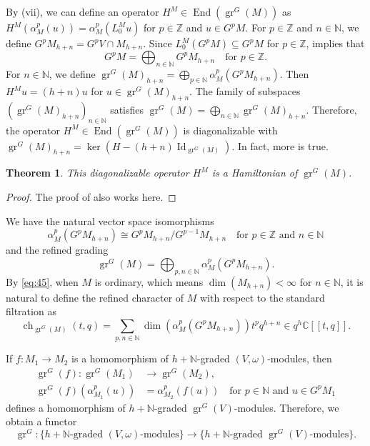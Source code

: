 \documentclass[a4paper, 12pt, reqno]{amsart}
\newtheorem{theorem}{Theorem}[section]
\theoremstyle{remark}
\DeclareMathOperator{\Id}{Id}
\DeclareMathOperator{\gr}{gr}
\DeclareMathOperator{\End}{End}
\DeclareMathOperator{\ch}{ch}
\begin{document}
By (vii), we can define an operator $H^M \in \End(\gr^G(M))$ as $H^M(\alpha_M^p(u)) = \alpha_M^p(L^M_0u)$ for $p \in \mathbb{Z}$ and $u \in G^pM$.
For $p \in \mathbb{Z}$ and $n \in \mathbb{N}$, we define $G^pM_{h + n} = G^pV \cap M_{h + n}$.
Since $L_0^M(G^pM) \subseteq G^pM$ for $p \in \mathbb{Z}$,  implies that
\begin{equation*}
  G^pM = \bigoplus_{n \in \mathbb{N}}G^pM_{h + n} \quad \text{for $p \in \mathbb{Z}$}.
\end{equation*}
For $n \in \mathbb{N}$, we define $\gr^G(M)_{h + n} = \bigoplus_{p \in \mathbb{N}}\alpha_M^p(G^pM_{h + n})$.
Then $H^Mu = (h + n)u$ for $u \in \gr^G(M)_{h + n}$.
The family of subspaces $(\gr^G(M)_{h + n})_{n \in \mathbb{N}}$ satisfies $\gr^G(M) = \bigoplus_{n \in \mathbb{N}}\gr^G(M)_{h + n}$.
Therefore, the operator $H^M \in \End(\gr^G(M))$ is diagonalizable with $\gr^G(M)_{h + n} = \ker(H - (h + n)\Id_{\gr^G(M)})$.
In fact, more is true.

\begin{theorem}
  \label{thr:51}
  This diagonalizable operator $H^M$ is a Hamiltonian of $\gr^G(M)$.
\end{theorem}

\begin{proof}
  The proof of  also works here.
\end{proof}

We have the natural vector space isomorphisms
\begin{equation*}
  \alpha_M^p(G^pM_{h + n}) \cong G^pM_{h + n}/G^{p - 1}M_{h + n} \quad \text{for $p \in \mathbb{Z}$ and $n \in \mathbb{N}$}
\end{equation*}
and the refined grading
\begin{equation}
  \label{eq:45}
  \gr^G(M) = \bigoplus_{p, n \in \mathbb{N}}\alpha_M^p(G^pM_{h + n}).
\end{equation}
By \eqref{eq:45}, when $M$ is ordinary, which means $\dim(M_{h + n}) < \infty$ for $n \in \mathbb{N}$, it is natural to define the refined character of $M$ with respect to the standard filtration as
\begin{equation*}
  \ch_{\gr^G(M)}(t, q) = \sum_{p, n \in \mathbb{N}}\dim(\alpha_M^p(G^pM_{h + n}))t^pq^{h + n} \in q^h\mathbb{C}[[t, q]].
\end{equation*}

If $f: M_1 \to M_2$ is a homomorphism of $h + \mathbb{N}$-graded $(V, \omega)$-modules, then
\begin{align*}
  \gr^G(f): \gr^G(M_1) &\to \gr^G(M_2), \\
  \gr^G(f)(\alpha^p_{M_1}(u)) &= \alpha^p_{M_2}(f(u)) \quad \text{for $p \in \mathbb{N}$ and $u \in G^pM_1$}
\end{align*}
defines a homomorphism of $h + \mathbb{N}$-graded $\gr^G(V)$-modules.
Therefore, we obtain a functor
\begin{equation*}
  \gr^G: \{\text{$h + \mathbb{N}$-graded $(V, \omega)$-modules}\} \to \{\text{$h + \mathbb{N}$-graded $\gr^G(V)$-modules}\}.
\end{equation*}
\end{document}
